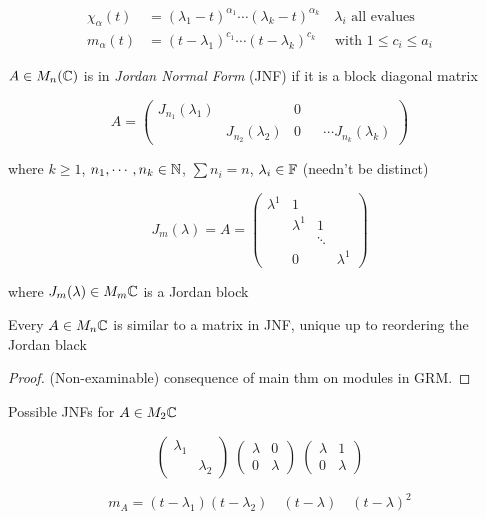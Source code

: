 \documentclass[a4paper]{article}
\begin{document}
\begin{align*}
\chi_{\alpha}(t) & = (\lambda_{1} - t)^{\alpha_{1}}\cdots (\lambda_{k} - t)^{\alpha_{k}} \quad \lambda_{i} \text{ all evalues } \\
m_{\alpha} (t) & = ( t - \lambda_{1})^{c_{1}} \cdots (t - \lambda_{k} )^{c_{k}} \quad \text{ with } 1 \leq c_{i} \leq a_{i}
\end{align*}


\begin{defi}
	$ A \in M_{n}(\mathbb{C}) $ is in \emph{Jordan Normal Form} (JNF) if it is a block diagonal matrix
	
	\[ A = \begin{pmatrix}
	J_{n_{1}}(\lambda_{1}) & & 0\\
	& J_{n_{2}}(\lambda_{2}) & 
	0 & & \cdots J_{n_{k}}(\lambda_{k})
	\end{pmatrix} \]
	
	
	where $ k \geq 1 $, $ n_{1},\cdots,n_{k} \in \mathbb{N} $, $ \sum n_{i} = n $, $ \lambda_{i} \in \mathbb{F} $ (needn't be distinct)
	
	
	
	\[ J_{m}(\lambda) = A = \begin{pmatrix}
	\lambda^{1} & 1 & & \\
	& \lambda^{1} & 1 & \\
	& & \ddots & \\
	& 0 & & \lambda^{1} 
	\end{pmatrix} \]
	
	where $ J_{m}(\lambda) \in M_{m} \mathbb{C}  $ is a Jordan block
	
\end{defi}
 
 
 \begin{thm} 
 	Every $ A \in M_{n}\mathbb{C} $ is similar to a matrix in JNF, unique up to reordering the Jordan black
 \end{thm}

\begin{proof}
	(Non-examinable) consequence of main thm on modules in GRM.
\end{proof}

\begin{eg}
	Possible JNFs for $ A \in M_{2} \mathbb{C} $
	
	
	
	\[ \begin{pmatrix}
	\lambda_{1} & \\
	& \lambda_{2}
	\end{pmatrix} \; \begin{pmatrix}
	\lambda & 0 \\
	0 & \lambda
	\end{pmatrix}\; \begin{pmatrix}
	\lambda & 1\\
	0 & \lambda
	\end{pmatrix}
	\]
	
	
	\[ m_{A} = (t - \lambda_{1})(t - \lambda_{2}) \quad (t - \lambda) \quad (t - \lambda)^{2} \]
	
\end{eg}
\end{document}
